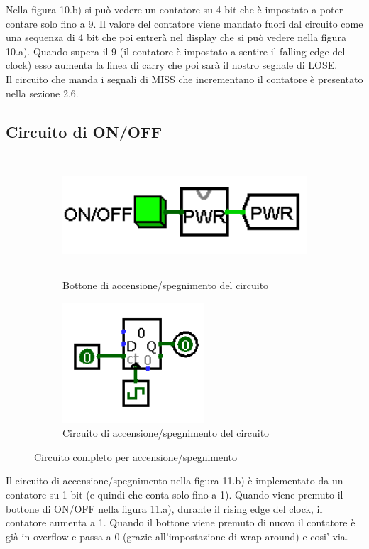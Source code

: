 \documentclass[11pt]{article}
\begin{document}
Nella figura 10.b) si può vedere un contatore su 4 bit che è impostato a poter contare solo fino a 9.
Il valore del contatore viene mandato fuori dal circuito come una sequenza di 4 bit che poi entrerà nel display che si può vedere nella figura
10.a).
Quando supera il 9 (il contatore è impostato a sentire il falling edge del clock) esso aumenta la linea di carry che poi sarà il nostro segnale di LOSE.
\\Il circuito che manda i segnali di MISS che incrementano il contatore è presentato nella sezione 2.6.

\pagebreak

\subsection{Circuito di ON/OFF}

\begin{figure}[h]
\begin{subfigure}{0.45\textwidth}
\includegraphics[width=1\linewidth, height=4.5cm]{immagini/on_off} 
\caption{Bottone di accensione/spegnimento del circuito}
\label{fig:subfig5}
\end{subfigure}
\begin{subfigure}{0.45\textwidth}
\includegraphics[width=1.2\linewidth, height=4.5cm]{immagini/circuito_on_off}
\caption{Circuito di accensione/spegnimento del circuito}
\label{fig:subfig6}
\end{subfigure}
\caption{Circuito completo per accensione/spegnimento}
\label{fig:fig11}
\end{figure}

Il circuito di accensione/spegnimento nella figura 11.b) è implementato da un contatore su 1 bit
(e quindi che conta solo fino a 1). Quando viene premuto il bottone di ON/OFF nella figura 11.a), durante il
rising edge del clock, il contatore aumenta a 1. Quando il bottone viene premuto di nuovo il contatore è
già in overflow e passa a 0 (grazie all'impostazione di wrap around) e cosi' via.
\end{document}
